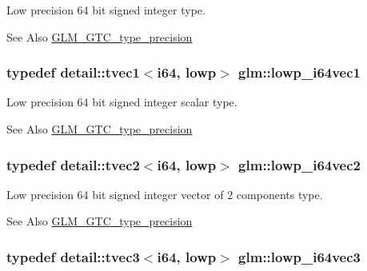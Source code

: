 Low precision 64 bit signed integer type. \begin{DoxySeeAlso}{See Also}
\hyperlink{group__gtc__type__precision}{G\-L\-M\-\_\-\-G\-T\-C\-\_\-type\-\_\-precision} 
\end{DoxySeeAlso}
\hypertarget{group__gtc__type__precision_gaf427ced1906a1788fdd9faab2e57c60a}{
\subsubsection[{lowp\-\_\-i64vec1}]{\setlength{\rightskip}{0pt plus 5cm}typedef detail\-::tvec1$<$i64, lowp$>$ {\bf glm\-::lowp\-\_\-i64vec1}}}\label{group__gtc__type__precision_gaf427ced1906a1788fdd9faab2e57c60a}
Low precision 64 bit signed integer scalar type. \begin{DoxySeeAlso}{See Also}
\hyperlink{group__gtc__type__precision}{G\-L\-M\-\_\-\-G\-T\-C\-\_\-type\-\_\-precision} 
\end{DoxySeeAlso}
\hypertarget{group__gtc__type__precision_gad88a04aaa07fabf57fdbad8e6b7bcc9c}{
\subsubsection[{lowp\-\_\-i64vec2}]{\setlength{\rightskip}{0pt plus 5cm}typedef detail\-::tvec2$<$i64, lowp$>$ {\bf glm\-::lowp\-\_\-i64vec2}}}\label{group__gtc__type__precision_gad88a04aaa07fabf57fdbad8e6b7bcc9c}
Low precision 64 bit signed integer vector of 2 components type. \begin{DoxySeeAlso}{See Also}
\hyperlink{group__gtc__type__precision}{G\-L\-M\-\_\-\-G\-T\-C\-\_\-type\-\_\-precision} 
\end{DoxySeeAlso}
\hypertarget{group__gtc__type__precision_gaa42f666ccdb6d1ef6326882b4f377678}{
\subsubsection[{lowp\-\_\-i64vec3}]{\setlength{\rightskip}{0pt plus 5cm}typedef detail\-::tvec3$<$i64, lowp$>$ {\bf glm\-::lowp\-\_\-i64vec3}}}\label{group__gtc__type__precision_gaa42f666ccdb6d1ef6326882b4f377678}
